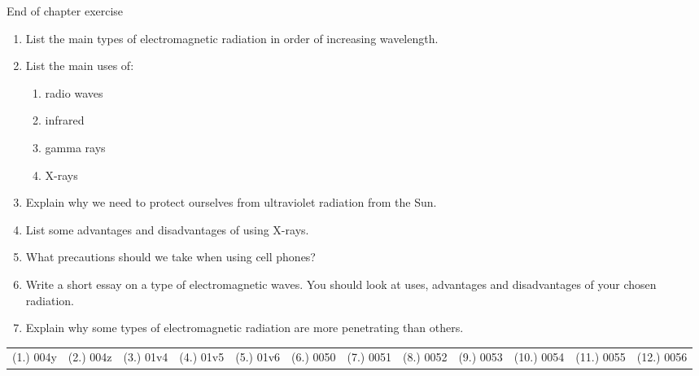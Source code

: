 \begin{eocexercises}{End of chapter exercise}
\begin{enumerate}[noitemsep, label=\textbf{\arabic*}. ]
\label{m38779*uid36}\item List the main types of electromagnetic radiation in order of increasing wavelength.\newline
\label{m38779*uid37}\item List the main uses of:
\label{m38779*id189946}\begin{enumerate}[noitemsep, label=\textbf{\alph*}. ] 
            \label{m38779*uid38}\item radio waves
\label{m38779*uid39}\item infrared
\label{m38779*uid40}\item gamma rays
\label{m38779*uid41}\item X-rays
\end{enumerate}
                \label{m38779*uid42}\item Explain why we need to protect ourselves from ultraviolet radiation from the Sun.\newline
\label{m38779*uid43}\item List some advantages and disadvantages of using X-rays.\newline
\label{m38779*uid44}\item What precautions should we take when using cell phones?\newline
\label{m38779*uid45}\item Write a short essay on a type of electromagnetic waves. You should look at uses, advantages and disadvantages of your chosen radiation.\newline
\label{m38779*uid46}\item Explain why some types of electromagnetic radiation are more penetrating than others.\newline
\end{enumerate}
  \label{m38779**end}
  \label{459e2bef85baf867f5850bc8338cad3a**end}
\par \practiceinfo
 \par \begin{tabular}[h]{cccccc}
 (1.) 004y  &  (2.) 004z  & (3.) 01v4 & (4.) 01v5 & (5.) 01v6 & (6.) 0050  &  (7.) 0051  &  (8.) 0052  &  (9.) 0053  &  (10.) 0054  &  (11.) 0055  &  (12.) 0056  & \end{tabular}
\end{eocexercises}
